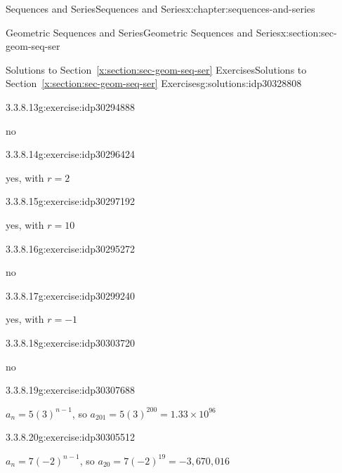 \documentclass[twoside,10pt,]{book}
\newcommand{\xreffont}{\relax}
\numberwithin{equation}{section}
\begin{document}
\begin{chapterptx}{Sequences and Series}{}{Sequences and Series}{}{}{x:chapter:sequences-and-series}
\begin{sectionptx}{Geometric Sequences and Series}{}{Geometric Sequences and Series}{}{}{x:section:sec-geom-seq-ser}
\begin{solutions-subsection}{Solutions to Section~{\xreffont\ref*{x:section:sec-geom-seq-ser}} Exercises}{}{Solutions to Section~{\xreffont\ref*{x:section:sec-geom-seq-ser}} Exercises}{}{}{g:solutions:idp30328808}
\par\medskip\noindent
\begin{exercisegroup}
\begin{divisionsolutioneg}{3.3.8.13}{}{g:exercise:idp30294888}%
\par\smallskip%
\noindent\hypertarget{g:solution:idp30295912-main}{}no\end{divisionsolutioneg}%
\begin{divisionsolutioneg}{3.3.8.14}{}{g:exercise:idp30296424}%
\par\smallskip%
\noindent\hypertarget{g:solution:idp30298216-main}{}yes, with \(r=2\)\end{divisionsolutioneg}%
\begin{divisionsolutioneg}{3.3.8.15}{}{g:exercise:idp30297192}%
\par\smallskip%
\noindent\hypertarget{g:solution:idp30297320-main}{}yes, with \(r=10\)\end{divisionsolutioneg}%
\begin{divisionsolutioneg}{3.3.8.16}{}{g:exercise:idp30295272}%
\par\smallskip%
\noindent\hypertarget{g:solution:idp30298984-main}{}no\end{divisionsolutioneg}%
\begin{divisionsolutioneg}{3.3.8.17}{}{g:exercise:idp30299240}%
\par\smallskip%
\noindent\hypertarget{g:solution:idp30307432-main}{}yes, with \(r=-1\)\end{divisionsolutioneg}%
\begin{divisionsolutioneg}{3.3.8.18}{}{g:exercise:idp30303720}%
\par\smallskip%
\noindent\hypertarget{g:solution:idp30302824-main}{}no\end{divisionsolutioneg}%
\end{exercisegroup}
\par\medskip\noindent
\begin{divisionsolution}{3.3.8.19}{}{g:exercise:idp30307688}%
\par\smallskip%
\noindent\hypertarget{g:solution:idp30307176-main}{}\({a_n} = 5{\left( 3 \right)^{n - 1}}\), so \(a_{201} = 5(3)^{200} = 1.33 \times 10^{96}\)\end{divisionsolution}%
\begin{divisionsolution}{3.3.8.20}{}{g:exercise:idp30305512}%
\par\smallskip%
\noindent\hypertarget{g:solution:idp30307816-main}{}\({a_n} = 7{\left( { - 2} \right)^{n - 1}}\), so \(a_{20} = 7(-2)^{19} = -3,670,016\)\end{divisionsolution}%

\end{solutions-subsection}
\end{sectionptx}
\end{chapterptx}
\end{document}
